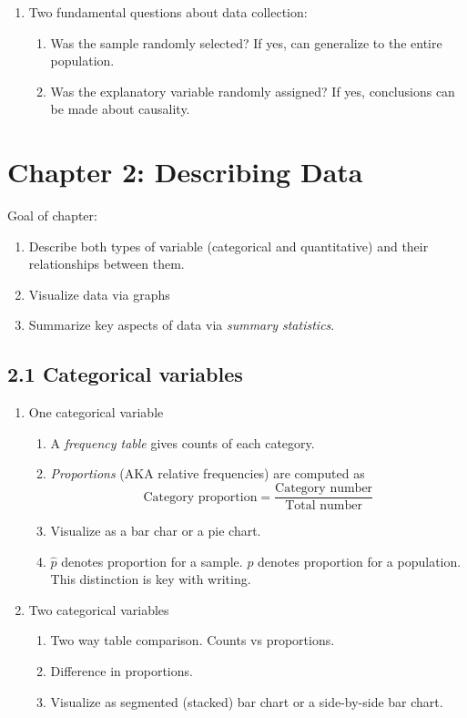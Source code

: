 \documentclass{article}
\begin{document}
\begin{enumerate}
\item Two fundamental questions about data collection:
\begin{enumerate}
\item Was the sample randomly selected? If yes, can generalize to the entire population.
\item Was the explanatory variable randomly assigned? If yes, conclusions can be made about causality.
\end{enumerate}

\end{enumerate}

\section{Chapter 2: Describing Data}

Goal of chapter:
\begin{enumerate}
\item Describe both types of variable (categorical and quantitative) and their relationships between them.
\item Visualize data via graphs
\item Summarize key aspects of data via \emph{summary statistics}.
\end{enumerate}

\subsection{2.1 Categorical variables}

\begin{enumerate}

\item One categorical variable
\begin{enumerate}
\item A \emph{frequency table} gives counts of each category.
\item \emph{Proportions} (AKA relative frequencies) are computed as 
\[
\text{Category proportion} = \frac{\text{Category number}}{\text{Total number}}
\]
\item Visualize as a bar char or a pie chart.
\item $\hat{p}$ denotes proportion for a sample. $p$ denotes proportion for a population. This distinction is key with writing.
\end{enumerate}

\item Two categorical variables
\begin{enumerate}
\item Two way table comparison. Counts vs proportions. 
\item Difference in proportions.
\item Visualize as segmented (stacked) bar chart or a side-by-side bar chart.
\end{enumerate}

\end{enumerate}
\end{document}

